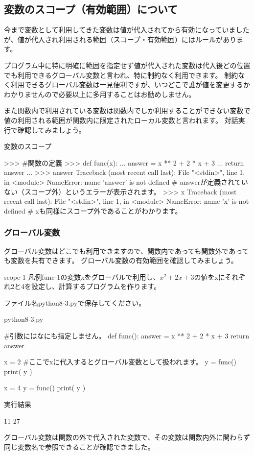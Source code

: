 \documentclass[11pt,a4paper,dvipdfmx,titlepage]{jsreport}
\begin{document}
\subsection{変数のスコープ（有効範囲）について}
今まで変数として利用してきた変数は値が代入されてから有効になっていましたが、値が代入され利用される範囲（スコープ・有効範囲）にはルールがあります。

プログラム中に特に明確に範囲を指定せず値が代入された変数は代入後どの位置でも利用できるグローバル変数と言われ、特に制約なく利用できます。
制約なく利用できるグローバル変数は一見便利ですが、いつどこで誰が値を変更するかわかりませんので必要以上に多用することはお勧めしません。

また関数内で利用されている変数は関数内でしか利用することができない変数で値の利用される範囲が関数内に限定されたローカル変数と言われます。
 {\gt 対話実行}で確認してみましょう。
\begin{grabox}{変数のスコープ}
\begin{listing}{1}
>>> #関数の定義
>>> def func(x):
...     answer = x ** 2 + 2 * x + 3
...     return answer
... 
>>> answer
Traceback (most recent call last):
  File "<stdin>", line 1, in <module>
NameError: name 'answer' is not defined
# answerが定義されていない（スコープ外）というエラーが表示されます。
>>> x
Traceback (most recent call last):
  File "<stdin>", line 1, in <module>
NameError: name 'x' is not defined
# xも同様にスコープ外であることがわかります。
\end{listing}
\end{grabox}
\newpage
\subsubsection{グローバル変数}
グローバル変数はどこでも利用できますので、関数内であっても関数外であっても変数を共有できます。
グローバル変数の有効範囲を確認してみましょう。

\begin{pabox}{scope-1}
凡例func-1の変数xをグローバルで利用し、$x^2 + 2 x + 3$の値をxにそれぞれ2と4を設定し、計算するプログラムを作ります。

ファイル名python8-3.pyで保存してください。
\begin{codebox}{python8-3.py}
\begin{listing}{1}
#引数にはなにも指定しません。
def func():
    answer = x ** 2 + 2 * x + 3
    return answer

x = 2
#ここでxに代入するとグローバル変数として扱われます。
y = func()
print( y )

x = 4
y = func()
print( y )
\end{listing}
実行結果
\begin{listing}{1}
11
27
\end{listing}
\end{codebox}
\end{pabox}
グローバル変数は関数の外で代入された変数で、その変数は関数内外に関わらず同じ変数名で参照できることが確認できました。
\end{document}
